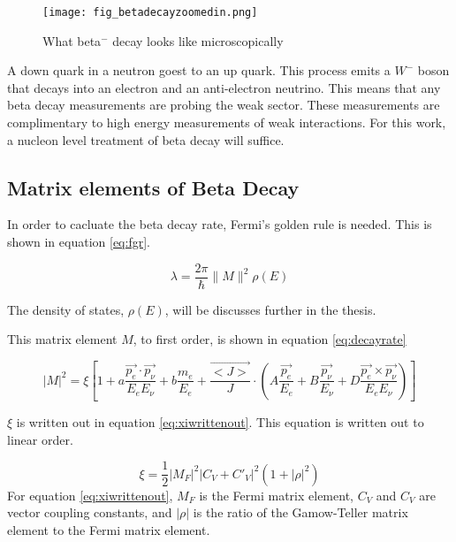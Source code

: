 \documentclass[main.tex]{subfiles}
\begin{document}
\begin{figure}[!htb]
	\centerline{\texttt{[image: fig\_betadecayzoomedin.png]}}
	\caption{What beta$^{-}$ decay looks like microscopically}
	\label{fig:betadecaymicro}
\end{figure}

A down quark in a neutron goest to an up quark.
This process emits a $W^{-}$ boson that decays into an electron and an anti-electron neutrino.
This means that any beta decay measurements are probing the weak sector. 
These measurements are complimentary to high energy measurements of weak interactions.
For this work, a nucleon level treatment of beta decay will suffice.  

\subsection{Matrix elements of Beta Decay}
In order to cacluate the beta decay rate, Fermi's golden rule is needed.
This is shown in equation \ref{eq:fgr}.

\begin{equation}
	\lambda = \frac{2\pi}{\hbar}\|M\|^{2}\rho(E)
	\label{eq:fgr}
\end{equation}

The density of states, $\rho(E)$, will be discusses further in the thesis. 

This matrix element $M$, to first order, is shown in equation \ref{eq:decayrate} \cite{Gon19}

\begin{equation}
	|M|^{2} = \xi [1 + a \frac{\vec{p_{e}} \cdot \vec{p_{\nu}}} {E_{e} E_{\nu}}  +  b \frac{m_{e}}{E_{e}} + \frac{\vec{<J>}}{J} \cdot (A \frac{ \vec{p_{e}} }{E_{e}} + B \frac{\vec{p_{\nu}}}{E_{\nu}} + D \frac{\vec{p_{e}} \times \vec{p_{\nu}}}{E_{e} E_{\nu}})]
	\label{eq:decayrate}
\end{equation}

$\xi$ is written out in equation \ref{eq:xiwrittenout}. 
This equation is written out to linear order.
 
\begin{equation}
	\xi = \frac{1}{2} |M_{F}|^{2} |C_{V} + C'_{V}|^{2} (1 + |\rho|^{2})
	\label{eq:xiwrittenout}
\end{equation}
For equation \ref{eq:xiwrittenout}, $M_{F}$ is the Fermi matrix element, $C_{V}$ and $C_{V}$ are vector coupling constants, and $|\rho|$ is the ratio of the Gamow-Teller matrix element to the Fermi matrix element.
\cite{Gon19}
\end{document}
